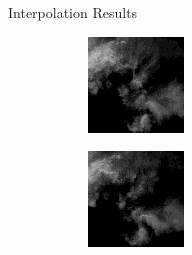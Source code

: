 \documentclass{beamer}
\begin{document}
\begin{frame}{Interpolation Results}
	\begin{figure}
	    \begin{subfigure}{.3\textwidth}
	        \centering
	        \begin{mdframed}[style=blue,nobreak=true,align=center]
	        \includegraphics[width=\linewidth]{fig/inter/0.png}
	        \end{mdframed}
	    \end{subfigure}
	    \begin{subfigure}{.3\textwidth}
	        \centering
	        \begin{mdframed}[style=red,nobreak=true,align=center]
	        \includegraphics[width=\linewidth]{fig/inter/1.png}

\end{mdframed}
\end{subfigure}
\end{figure}
\end{frame}
\end{document}
